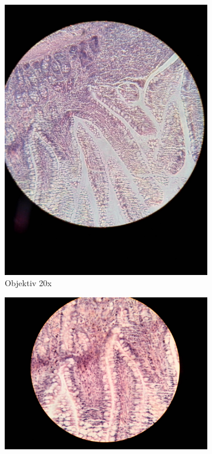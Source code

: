 \begin{figure}[h!]
	\begin{subfigure}[b]{0.3\textwidth}
		\includegraphics[width=1\textwidth]{../images/04_mammal_illeum.jpg}
		\caption{Objektiv 20x}
		\label{fig:04_mammal_ileum}
	\end{subfigure}
	\begin{subfigure}[b]{0.3\textwidth}
		\includegraphics[angle=270, width=1\textwidth]{../images/05_mammal_illeum.jpg}

\end{subfigure}
\end{figure}
